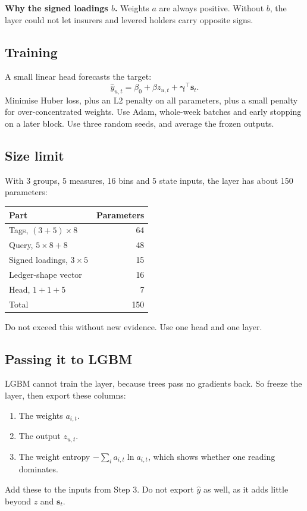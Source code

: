 \documentclass[11pt]{article}
\begin{document}
\textbf{Why the signed loadings $b$.} Weights $a$ are always positive. Without $b$, the layer could not let insurers and levered holders carry opposite signs.

\subsection{Training}
A small linear head forecasts the target:
\[
\hat{y}_{u,t} = \beta_0 + \beta z_{u,t} + \boldsymbol{\gamma}^\top \mathbf{s}_t .
\]
Minimise Huber loss, plus an L2 penalty on all parameters, plus a small penalty for over-concentrated weights. Use Adam, whole-week batches and early stopping on a later block. Use three random seeds, and average the frozen outputs.

\subsection{Size limit}
With 3 groups, 5 measures, 16 bins and 5 state inputs, the layer has about 150 parameters:
\begin{center}\small
\begin{tabular}{@{}lr@{}}
\toprule
Part & Parameters \\
\midrule
Tags, $(3+5)\times 8$ & 64 \\
Query, $5\times 8 + 8$ & 48 \\
Signed loadings, $3\times 5$ & 15 \\
Ledger-shape vector & 16 \\
Head, $1 + 1 + 5$ & 7 \\
\midrule
Total & 150 \\
\bottomrule
\end{tabular}
\end{center}
Do not exceed this without new evidence. Use one head and one layer.

\subsection{Passing it to LGBM}
LGBM cannot train the layer, because trees pass no gradients back. So freeze the layer, then export these columns:
\begin{enumerate}
\item The weights $a_{i,t}$.
\item The output $z_{u,t}$.
\item The weight entropy $-\sum_i a_{i,t}\ln a_{i,t}$, which shows whether one reading dominates.
\end{enumerate}
Add these to the inputs from Step 3. Do not export $\hat{y}$ as well, as it adds little beyond $z$ and $\mathbf{s}_t$.
\end{document}
